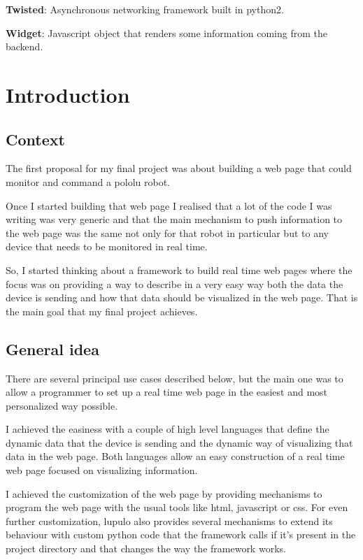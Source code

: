 \documentclass[12pt]{article}
\begin{document}
            \textbf{Twisted}: Asynchronous networking framework built
                in python2.

            \textbf{Widget}: Javascript object that renders some
                information coming from the backend.

            \setlength{\parindent}{1cm}

        \newpage
        \section{Introduction}
        \subsection{Context}
            The first proposal for my final project was about building a web
            page that could monitor and command a pololu robot.

            Once I started building that web page I realised that a lot of the
            code I was writing was very generic and that the main mechanism to
            push information to the web page was the same not only for that
            robot in particular but to any device that needs to be monitored in
            real time.

            So, I started thinking about a framework to build real time web
            pages where the focus was on providing a way to describe in a very
            easy way both the data the device is sending and how that data
            should be visualized in the web page. That is the main goal that my
            final project achieves.

        \subsection{General idea}
            There are several principal use cases described below, but the main
            one was to allow a programmer to set up a real time web page in the
            easiest and most personalized way possible.

            I achieved the easiness with a couple of high level languages that
            define the dynamic data that the device is sending and the dynamic
            way of visualizing that data in the web page. Both languages allow
            an easy construction of a real time web page focused on visualizing
            information.

            I achieved the customization of the web page by providing mechanisms
            to program the web page with the usual tools like html, javascript
            or css. For even further customization, lupulo also provides several
            mechanisms to extend its behaviour with custom python code that the
            framework calls if it's present in the project directory and that
            changes the way the framework works.
\end{document}
